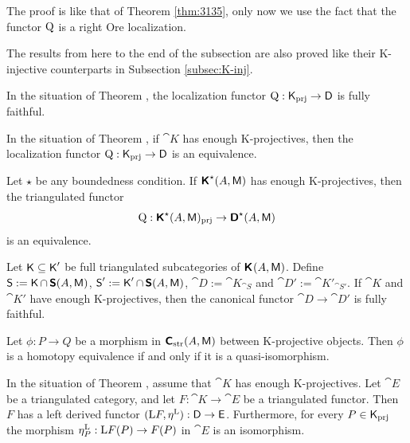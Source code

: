 The proof is like that of Theorem \ref{thm:3135}, only now we use the fact that
the functor $\operatorname{Q}$ is a right Ore localization. 

The results from here to the end of the subsection are also proved like their 
K-injective counterparts in Subsection \ref{subsec:K-inj}. 

\begin{cor} \label{cor:3145} 
In the situation of Theorem \tup{\ref{thm:3145}}, 
the localization functor 
$\operatorname{Q} : \operatorname{\mathsf{K}}_{\mathrm{prj}} \to \operatorname{\mathsf{D}}$
is fully faithful.
\end{cor}
        
\begin{cor} \label{cor:1520}
In the situation of Theorem \tup{\ref{thm:3145}}, 
if $\cat{K}$ has enough K-pro\-jectives, then the localization functor
$\operatorname{Q} : \operatorname{\mathsf{K}}_{\mathrm{prj}} \to \operatorname{\mathsf{D}}$
is an equivalence.
\end{cor}

\begin{cor} \label{cor:3146}
Let $\star$ be any boundedness condition. If $\boldsymbol{\mathsf{K}}^{\star}(A, \operatorname{\mathsf{M}})$ has 
enough K-projectives, then the triangulated functor
\[ \operatorname{Q} : \boldsymbol{\mathsf{K}}^{\star}(A, \operatorname{\mathsf{M}})_{\mathrm{prj}} \to
\boldsymbol{\mathsf{D}}^{\star}(A, \operatorname{\mathsf{M}}) \]
is an equivalence.
\end{cor}

\begin{cor} \label{cor:1521}
Let $\operatorname{\mathsf{K}} \subseteq \operatorname{\mathsf{K}}'$ be full triangulated subcategories of 
$\boldsymbol{\mathsf{K}}^{}(A, \operatorname{\mathsf{M}})$.
Define 
$\operatorname{\mathsf{S}} := \operatorname{\mathsf{K}} \cap \, \boldsymbol{\mathsf{S}}(A, \operatorname{\mathsf{M}})$,
$\operatorname{\mathsf{S}}' := \operatorname{\mathsf{K}}' \cap \, \boldsymbol{\mathsf{S}}(A, \operatorname{\mathsf{M}})$,
$\cat{D} := \cat{K}_{\cat{S}}$
and
$\cat{D}' := \cat{K}'_{\cat{S}'}$.
If $\cat{K}$ and $\cat{K}'$ have enough K-projectives, then the canonical 
functor $\cat{D} \to \cat{D}'$ is fully faithful. 
\end{cor}

\begin{cor} \label{cor:1923} 
Let $\phi : P \to Q$ be a morphism in $\boldsymbol{\mathsf{C}}_{\mathrm{str}}(A, \operatorname{\mathsf{M}})$ 
between K-projective objects. Then $\phi$ is a homotopy equivalence if and only 
if it is a quasi-isomorphism. 
\end{cor}

\begin{thm}  \label{thm:5051}  
In the situation of Theorem \tup{\ref{thm:3145}}, assume that $\cat{K}$ has 
enough K-projectives. Let $\cat{E}$ be a triangulated category, and let 
$F : \cat{K} \to \cat{E}$
be a triangulated functor. Then $F$ has a left derived functor 
$(\mathrm{L} F, \eta^{\mathrm{L}}) : \operatorname{\mathsf{D}} \to \operatorname{\mathsf{E}}$.
Furthermore, for every $P \in \operatorname{\mathsf{K}}_{\mathrm{prj}}$ the morphism 
$\eta^{\mathrm{L}}_P :\mathrm{L} F(P) \to F(P)$
in $\cat{E}$ is an isomorphism. 
\end{thm}

